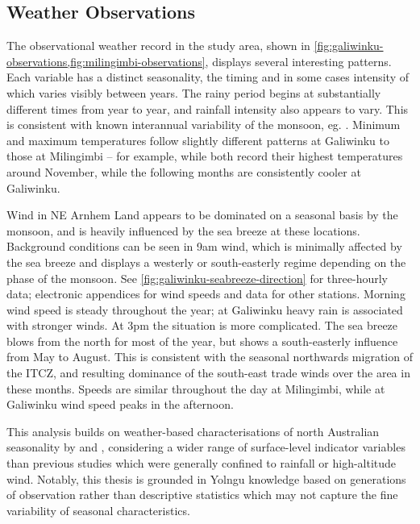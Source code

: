 \subsection{Weather Observations}
\label{ssec:disc-weather}

The observational weather record in the study area, shown in
\cref{fig:galiwinku-observations,fig:milingimbi-observations}, displays
several interesting patterns.  Each variable has a distinct seasonality,
the timing and in some cases intensity of which varies visibly between years.
The rainy period begins at substantially different times from year to year,
and rainfall intensity also appears to vary.  This is consistent with known
interannual variability of the monsoon, eg. \citet{cook2001}.
%
Minimum and maximum temperatures follow slightly different patterns at
Galiwinku to those at Milingimbi -- for example, while both record their
highest temperatures around November, while the following months are consistently
cooler at Galiwinku.

Wind in NE Arnhem Land appears to be dominated on a seasonal basis by the
monsoon, and is heavily influenced by the sea breeze at these
locations.  Background conditions can be seen in 9am wind, which is minimally
affected by the sea breeze and displays a westerly or south-easterly regime
depending on the phase of the monsoon.  See \cref{fig:galiwinku-seabreeze-direction}
for three-hourly data; electronic appendices for wind speeds and data for other stations.
Morning wind speed is steady throughout the year; at Galiwinku heavy rain
is associated with stronger winds.
%
At 3pm the situation is more complicated.  The sea breeze blows from the north
for most of the year, but shows a south-easterly influence from May to
August.  This is consistent with the seasonal northwards migration of the ITCZ,
and resulting dominance of the south-east trade winds over the area in these
months.  Speeds are similar throughout the day at Milingimbi, while at Galiwinku
wind speed peaks in the afternoon.


This analysis builds on weather-based characterisations of north Australian
seasonality by \citet{cook2001} and \citet{holland1985}, considering a wider
range of surface-level indicator variables than previous studies which were
generally confined to rainfall or high-altitude wind.  Notably, this thesis
is grounded in Yolngu knowledge based on generations of observation rather than
descriptive statistics which may not capture the fine variability of seasonal
characteristics.



